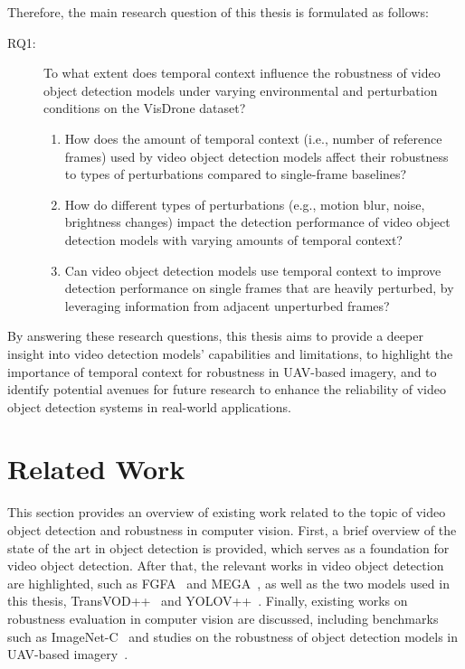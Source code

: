 \documentclass[final,twoside]{vutinfth}
\begin{document}
Therefore, the main research question of this thesis is formulated as follows:

\begin{description}
    \item[RQ1:] To what extent does temporal context influence the robustness of video object detection models under varying environmental and perturbation conditions on the VisDrone dataset?
    \begin{enumerate}
        \item[RQ1.1:] How does the amount of temporal context (i.e., number of reference frames) used by video object detection models affect their robustness to types of perturbations compared to single-frame baselines?
        \item[RQ1.2:] How do different types of perturbations (e.g., motion blur, noise, brightness changes) impact the detection performance of video object detection models with varying amounts of temporal context?
        \item[RQ1.3:] Can video object detection models use temporal context to improve detection performance on single frames that are heavily perturbed, by leveraging information from adjacent unperturbed frames?
    \end{enumerate}
\end{description}

By answering these research questions, this thesis aims to provide a deeper insight into video detection models' capabilities and limitations, to highlight the importance of temporal context for robustness in UAV-based imagery, and to identify potential avenues for future research to enhance the reliability of video object detection systems in real-world applications.


\section{Related Work}
This section provides an overview of existing work related to the topic of video object detection and robustness in computer vision.
First, a brief overview of the state of the art in object detection is provided, which serves as a foundation for video object detection.
After that, the relevant works in video object detection are highlighted, such as FGFA~\cite{zhu2017flowguidedfeatureaggregationvideo} and MEGA~\cite{chen2020memoryenhancedgloballocalaggregation}, as well as the two models used in this thesis, TransVOD++~\cite{zhou2022transvod} and YOLOV++~\cite{shi2024yolovpp}.
Finally, existing works on robustness evaluation in computer vision are discussed, including benchmarks such as ImageNet-C~\cite{hendrycks2019benchmarking} and studies on the robustness of object detection models in UAV-based imagery~\cite{liu2024UAVRobustness}.
\end{document}
